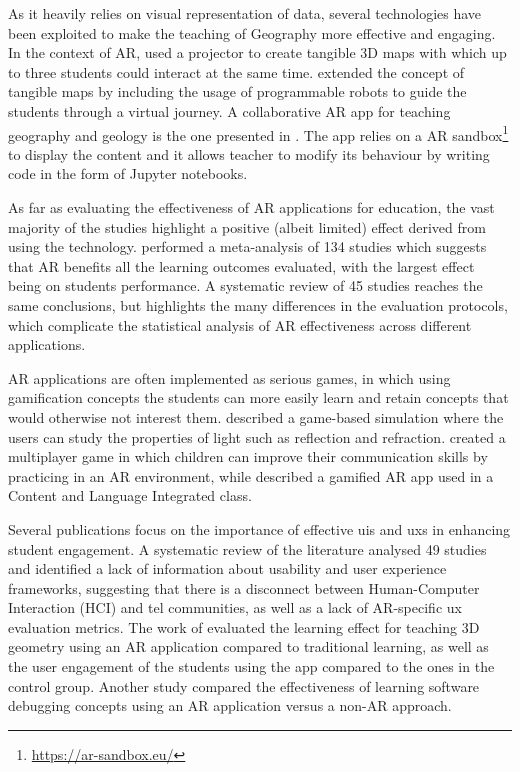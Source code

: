 As it heavily relies on visual representation of data, several technologies have been exploited to make the teaching of Geography more effective and engaging.
In the context of AR, \cite{palaigeorgiou2018touching} used a projector to create tangible 3D maps with which up to three students could interact at the same time.
\cite{xefteris2019mixing} extended the concept of tangible maps by including the usage of programmable robots to guide the students through a virtual journey. A collaborative AR app for teaching geography and geology is the one presented in \citep{wellmann2022open}. The app relies on a AR sandbox\footnote{\url{https://ar-sandbox.eu/}} to display the content and it allows teacher to modify its behaviour by writing code in the form of Jupyter notebooks.

As far as evaluating the effectiveness of AR applications for education, the vast majority of the studies highlight a positive (albeit limited) effect derived from using the technology.
\cite{CHANG2022104641} performed a meta-analysis of 134 studies which suggests that AR benefits all the learning outcomes evaluated, with the largest effect being on students performance.
A systematic review of 45 studies \citep{da2019perspectives} reaches the same conclusions, but highlights the many differences in the evaluation protocols, which complicate the statistical analysis of AR effectiveness across different applications.

AR applications are often implemented as serious games, in which using gamification concepts the students can more easily learn and retain concepts that would otherwise not interest them.
\cite{oh2017hybrid} described a game-based simulation where the users can study the properties of light such as reflection and refraction.
\cite{lopez2020emofindar} created a multiplayer game in which children can improve their communication skills by practicing in an AR environment, while \cite{ccelik2022use} described a gamified AR app used in a Content and Language Integrated class.

Several publications focus on the importance of effective \glspl{ui} and \glspl{ux} in enhancing student engagement.
A systematic review of the literature analysed 49 studies \citep{LAW2021100321} and identified a lack of information about usability and user experience frameworks, suggesting that there is a disconnect between Human-Computer Interaction (HCI) and \gls{tel} communities, as well as a lack of AR-specific \gls{ux} evaluation metrics.
The work of \cite{thamrongrat2019design} evaluated the learning effect for teaching 3D geometry using an AR application compared to traditional learning, as well as the user engagement of the students using the app compared to the ones in the control group.
Another study \citep{alrashidi2017evaluating} compared the effectiveness of learning software debugging concepts using an AR application versus a non-AR approach.

